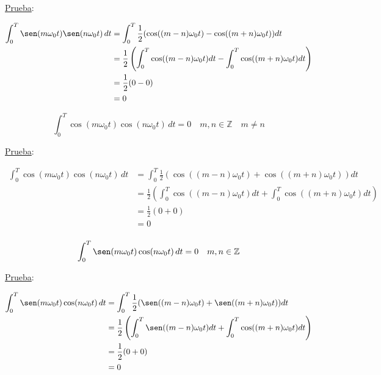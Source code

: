 \underline{Prueba}:

\begin{equation*}
\begin{split}
    \int_{0}^{T}\sen(m\omega_0 t)\sen(n\omega_0 t)\,dt
        &=\int_{0}^{T}\frac{1}{2}(\cos((m-n)\omega_0 t)-
          \cos((m+n)\omega_0 t))dt\\
        &=\frac{1}{2}\left(\int_{0}^{T}\cos((m-n)\omega_0 t)dt-
          \int_{0}^{T}\cos((m+n)\omega_0 t)dt\right)\\
        &=\frac{1}{2}(0-0)\\
        &=0\\
\end{split}
\end{equation*}

\begin{equation}
    \int_{0}^{T}\cos(m\omega_0 t)\cos(n\omega_0 t)\,dt=0
    \quad m,n \in\mathbb{Z}\quad m\neq n
\end{equation}

\underline{Prueba}:

\begin{equation*}
\begin{split}
    \int_{0}^{T}\cos(m\omega_0 t)\cos(n\omega_0 t)\,dt
        &=\int_{0}^{T}\frac{1}{2}(\cos((m-n)\omega_0 t)+
          \cos((m+n)\omega_0 t))dt\\
        &=\frac{1}{2}\left(\int_{0}^{T}\cos((m-n)\omega_0 t)dt+
          \int_{0}^{T}\cos((m+n)\omega_0 t)dt\right)\\
        &=\frac{1}{2}(0+0)\\
        &=0\\
\end{split}
\end{equation*}

\begin{equation}
    \int_{0}^{T}\sen(m\omega_0 t)\cos(n\omega_0 t)\,dt=0\quad m,n \in\mathbb{Z}
\end{equation}

\underline{Prueba}:

\begin{equation*}
\begin{split}
    \int_{0}^{T}\sen(m\omega_0 t)\cos(n\omega_0 t)\,dt
        &=\int_{0}^{T}\frac{1}{2}(\sen((m-n)\omega_0 t)+
          \sen((m+n)\omega_0 t))dt\\
        &=\frac{1}{2}\left(\int_{0}^{T}\sen((m-n)\omega_0 t)dt+
          \int_{0}^{T}\cos((m+n)\omega_0 t)dt\right)\\
        &=\frac{1}{2}(0+0)\\
        &=0\\
\end{split}
\end{equation*}

